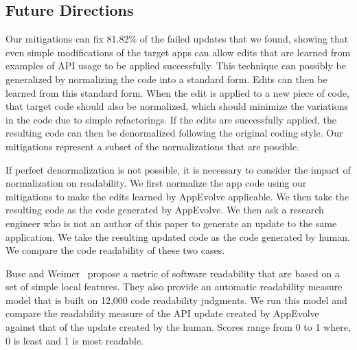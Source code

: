 \subsection{Future Directions}
Our mitigations can fix 81.82\% of the failed updates that we found,
showing that even simple modifications of the target apps can allow
edits that are learned from examples of API usage to be applied
successfully. This technique can possibly be generalized by normalizing the
code into a standard form. Edits can then be learned from this standard
form. When the edit is applied to a new piece of code, that target code
should also be normalized, which should minimize the variations in the code
due to simple refactorings. If the edits are successfully applied, the
resulting code can then be denormalized following the original coding
style.  Our mitigations represent a subset of the normalizations that are
possible.

If perfect denormalization is not possible, it is necessary to consider the
impact of normalization on readability. We first normalize the app code
using our mitigations to make the edits learned by AppEvolve applicable. We
then take the resulting code as the code generated by AppEvolve. We then
ask a research engineer who is not an author of this paper to generate an
update to the same application. We take the resulting updated code as the
code generated by human. We compare the code readability of these two cases.

Buse and Weimer~\cite{Buse:2008:MSR:1390630.1390647} propose a metric of
software readability that are based on a set of simple local features. They
also provide an automatic readability measure model that is built on 12,000
code readability judgments. We run this model and compare the readability
measure of the API update created by AppEvolve against that of the update
created by the human.  Scores range from 0 to 1 where, 0 is least and 1 is
most readable.


